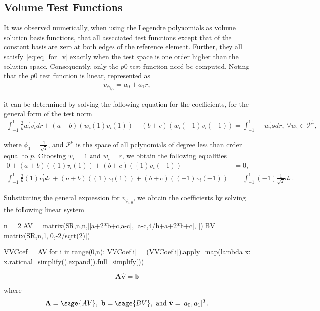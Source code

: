 \documentclass{article}
\numberwithin{equation}{section}
\newcommand{\vect}[1]{\mathbf{{#1}}}
\newcommand{\mat}[1]{\mathbf{{#1}}}
\begin{document}
\subsection{Volume Test Functions}

It was observed numerically, when using the Legendre polynomials as volume solution basis functions, that all associated
test functions except that of the constant basis are zero at both edges of the reference element. Further, they all
satisfy~\eqref{eq:eq_for_v} exactly when the test space is one order higher than the solution space. Consequently, only
the $p0$ test function need be computed. Noting that the $p0$ test function is linear, represented as
\begin{align*}
v_{{\phi}_{i,0}} = a_0 + a_1 r,
\end{align*}

it can be determined by solving the following equation for the coefficients, for the general form of the test norm
\begin{align*}
\int_{-1}^{1} \frac{2}{h} w_i^{'} v_i^{'} dr + (a+b)(w_i(1)v_i(1))+(b+c)(w_i(-1)v_i(-1))
= 
\int_{-1}^{1} -w_i^{'} \phi dr,\ \forall w_i \in \mathcal{P}^1,
\end{align*}

where $\phi_0 = \frac{1}{\sqrt{2}}$, and $\mathcal{P}^p$ is the space of all polynomials of degree less than order
equal to $p$. Choosing $w_i = 1$ and $w_i = r$, we obtain the following equalities
\begin{align*}
0 + (a+b)((1)v_i(1))+(b+c)((1)v_i(-1)) 
& =
0, \\
\int_{-1}^{1} \frac{2}{h} (1) v_i^{'} dr + (a+b)((1)v_i(1))+(b+c)((-1)v_i(-1))
& = 
\int_{-1}^{1} (-1) \frac{1}{\sqrt{2}} dr.
\end{align*}

Substituting the general expression for $v_{{\phi}_{i,0}}$, we obtain the coefficients by solving the following linear
system
\begin{sagesilent}
n = 2
AV = matrix(SR,n,n,[[a+2*b+c,a-c],
                    [a-c,4/h+a+2*b+c],
                   ])
BV = matrix(SR,n,1,[0,-2/sqrt(2)])

VVCoef = AV\BV
for i in range(0,n):
    VVCoef[i] = (VVCoef[i]).apply_map(lambda x: x.rational_simplify().expand().full_simplify())
\end{sagesilent}

\[
\mat{A} \hat{\vect{v}} = \vect{b}
\]

where
\[
\mat{A} = \sage{AV},\ \vect{b} = \sage{BV},\ \text{and}\ \hat{\vect{v}} = [a_0,a_1]^T.
\]
\end{document}
